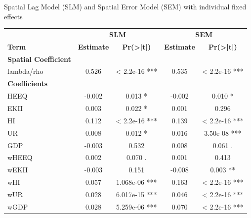 \documentclass[10pt]{beamer}
\begin{document}
\begin{frame}{Spatial Lag Model (SLM) and Spatial Error Model (SEM) with individual fixed effects}
\begin{table}[ht]
\centering
\scriptsize 
\begin{tabular}{l|cc|cc}
\hline
& \multicolumn{2}{c|}{\textbf{SLM}} & \multicolumn{2}{c}{\textbf{SEM}} \\
\textbf{Term} & \textbf{Estimate} & \textbf{Pr(>|t|)} & \textbf{Estimate} & \textbf{Pr(>|t|)} \\ 
\hline
\textbf{Spatial Coefficient} & & & & \\
lambda/rho & 0.526 & < 2.2e-16 *** & 0.535 & < 2.2e-16 *** \\
\hline
\textbf{Coefficients} & & & & \\
HEEQ & -0.002 & 0.013 * & -0.002 & 0.010 * \\
EKII & 0.003 & 0.022 * & 0.001 & 0.296 \\
HI & 0.112 & < 2.2e-16 *** & 0.139 & < 2.2e-16 *** \\
UR & 0.008 & 0.012 * & 0.016 & 3.50e-08 *** \\
GDP & -0.003 & 0.532 & 0.008 & 0.061 . \\
wHEEQ & 0.002 & 0.070 . & 0.001 & 0.413 \\
wEKII & -0.003 & 0.151 & -0.008 & 0.003 ** \\
wHI & 0.057 & 1.068e-06 *** & 0.163 & < 2.2e-16 *** \\
wUR & 0.028 & 6.017e-15 *** & 0.046 & < 2.2e-16 *** \\
wGDP & 0.028 & 5.259e-06 *** & 0.070 & < 2.2e-16 *** \\
\hline
\end{tabular}
\end{table}
\end{frame}
\end{document}
